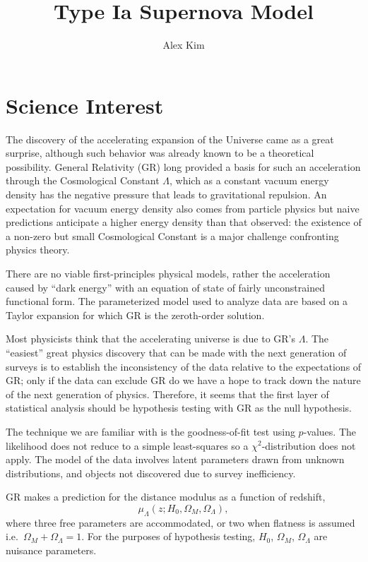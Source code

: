 \documentclass[preprint]{aastex}
\begin{document}
\title{Type Ia Supernova Model}
\author{Alex Kim}

\section{Science Interest}
The discovery of the accelerating expansion of the Universe came as a great surprise,
although such behavior was already known to be a theoretical possibility.
General Relativity (GR) long provided a basis for such an acceleration through
the Cosmological Constant $\Lambda$, which as a constant vacuum energy density has the
negative pressure that leads to gravitational repulsion.  An expectation
for vacuum energy density also comes from particle physics but naive predictions anticipate
a higher energy density than that observed: the existence of a
non-zero but small Cosmological Constant is a major challenge confronting physics theory.

There are no viable first-principles physical models, rather the acceleration caused by
``dark energy''  with an equation of state of fairly unconstrained functional form. The parameterized model used to analyze data are based on a Taylor expansion for which GR is the zeroth-order solution.

Most physicists think that the accelerating universe is due to
GR's $\Lambda$. The ``easiest'' great physics discovery that can be made with the next 
generation of surveys is to establish the inconsistency of the data relative to the
expectations of GR; only if the data can exclude GR do we have 
a hope to track down the nature of the next generation of physics.  Therefore, it seems that 
the first layer of statistical analysis should be hypothesis testing with
GR as the null hypothesis.

The technique we are familiar with is the goodness-of-fit test using $p$-values.
The likelihood does not reduce to a simple least-squares
so a $\chi^2$-distribution does not apply.  The model of the data involves latent parameters
drawn from unknown distributions, and objects not discovered due to survey inefficiency.  

GR makes a prediction for the distance modulus as a function of redshift,
\begin{equation}
\mu_\Lambda(z;H_0, \Omega_M, \Omega_\Lambda),
\end{equation}
where  three free parameters are accommodated, or two when flatness is assumed i.e.\
$\Omega_M+\Omega_\Lambda=1$.  For the purposes of hypothesis testing,
$H_0$, $\Omega_M$, $\Omega_\Lambda$ are nuisance parameters.
\end{document}

